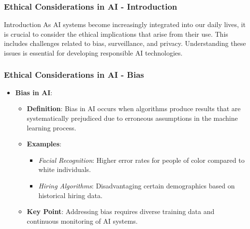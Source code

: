 \documentclass[aspectratio=169]{beamer}
\begin{document}
\begin{frame}[fragile]
    \frametitle{Ethical Considerations in AI - Introduction}
    \begin{block}{Introduction}
        As AI systems become increasingly integrated into our daily lives, it is crucial to consider the ethical implications that arise from their use. This includes challenges related to bias, surveillance, and privacy. Understanding these issues is essential for developing responsible AI technologies.
    \end{block}
\end{frame}

\begin{frame}[fragile]
    \frametitle{Ethical Considerations in AI - Bias}
    \begin{itemize}
        \item \textbf{Bias in AI}:
        \begin{itemize}
            \item \textbf{Definition}: Bias in AI occurs when algorithms produce results that are systematically prejudiced due to erroneous assumptions in the machine learning process.
            \item \textbf{Examples}:
                \begin{itemize}
                    \item \textit{Facial Recognition}: Higher error rates for people of color compared to white individuals.
                    \item \textit{Hiring Algorithms}: Disadvantaging certain demographics based on historical hiring data.
                \end{itemize}
            \item \textbf{Key Point}: Addressing bias requires diverse training data and continuous monitoring of AI systems.
        \end{itemize}
    \end{itemize}
\end{frame}
\end{document}
